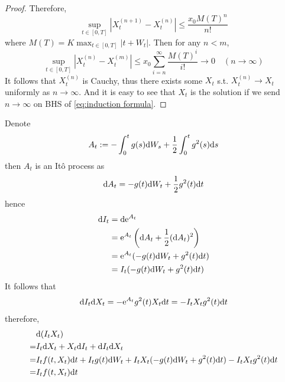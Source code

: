 \documentclass{homework}
\begin{document}
\begin{proof}
        Therefore,
        \[\sup_{t\in[0,T]}
        \left|X_t^{(n+1)}-X_t^{(n)}\right|
        \leq\frac{x_0M(T)^n}{n!}\]
        where $M(T)=K\max_{t\in[0,T]}|t+W_t|$.
        Then for any $n<m$,
        \[\sup_{t\in[0,T]}\left|X_t^{(n)}-X_t^{(m)}\right|
        \leq x_0\sum_{i=n}^\infty\frac{M(T)^i}{i!}
        \to 0\quad (n\to\infty)\]
        It follows that $X_t^{(n)}$ is Cauchy,
        thus there exists some $X_t$ s.t.
        $X_t^{(n)}\to X_t$
        uniformly as $n\to\infty$.
        And it is easy to see that $X_t$ is the solution
        if we send $n\to\infty$ on BHS of \cref{eq:induction formula}.
    \end{proof}

    \problem
    Denote
    \[A_t:=-\int_0^tg(s)\mathrm d W_s+\frac{1}{2}\int_0^tg^2(s)\mathrm d s\]
    then $A_t$ is an It\^o process as
    \[\mathrm d A_t=-g(t)\mathrm d W_t+\frac{1}{2}g^2(t)\mathrm d t\]
    hence
    \[\begin{aligned}
        \mathrm d I_t&=\mathrm d \mathrm e^{A_t}\\
        &=\mathrm e^{A_t}\left(\mathrm d A_t+\frac{1}{2}(\mathrm d A_t)^2\right)\\
        &=\mathrm e^{A_t}(-g(t)\mathrm d W_t+g^2(t)\mathrm d t)\\
        &=I_t(-g(t)\mathrm d W_t+g^2(t)\mathrm d t)
    \end{aligned}\]
    It follows that
    \[\mathrm d I_t\mathrm d X_t=-\mathrm e^{A_t}g^2(t)X_t\mathrm d t=-I_tX_tg^2(t)\mathrm d t\]
    therefore,
    \[\begin{aligned}
        &\mathrm d(I_tX_t)\\
        =&I_t\mathrm d X_t+X_t\mathrm d I_t+\mathrm d I_t\mathrm d X_t\\
        =&I_tf(t,X_t)\mathrm d t+I_tg(t)\mathrm d W_t+I_tX_t(-g(t)\mathrm d W_t+g^2(t)\mathrm d t)
        -I_tX_tg^2(t)\mathrm d t\\
        =&I_tf(t,X_t)\mathrm d t
    \end{aligned}\]
\end{document}
